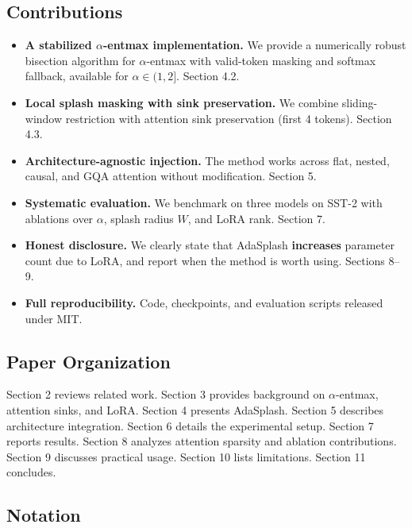 \subsection{Contributions}

\begin{itemize}
\item \textbf{A stabilized $\alpha$-entmax implementation.} We provide a numerically robust
  bisection algorithm for $\alpha$-entmax with valid-token masking and softmax
  fallback, available for $\alpha \in (1, 2]$. Section 4.2.
\item \textbf{Local splash masking with sink preservation.} We combine sliding-window
  restriction with attention sink preservation (first 4 tokens). Section 4.3.
\item \textbf{Architecture-agnostic injection.} The method works across flat, nested,
  causal, and GQA attention without modification. Section 5.
\item \textbf{Systematic evaluation.} We benchmark on three models on SST-2 with
  ablations over $\alpha$, splash radius $W$, and LoRA rank. Section 7.
\item \textbf{Honest disclosure.} We clearly state that AdaSplash \textbf{increases}
  parameter count due to LoRA, and report when the method is worth using.
  Sections 8--9.
\item \textbf{Full reproducibility.} Code, checkpoints, and evaluation scripts released
  under MIT.

\end{itemize}
\subsection{Paper Organization}

Section 2 reviews related work. Section 3 provides background on $\alpha$-entmax, 
attention sinks, and LoRA. Section 4 presents AdaSplash. Section 5 describes 
architecture integration. Section 6 details the experimental setup. Section 7 
reports results. Section 8 analyzes attention sparsity and ablation 
contributions. Section 9 discusses practical usage. Section 10 lists 
limitations. Section 11 concludes.



\subsection{Notation}
